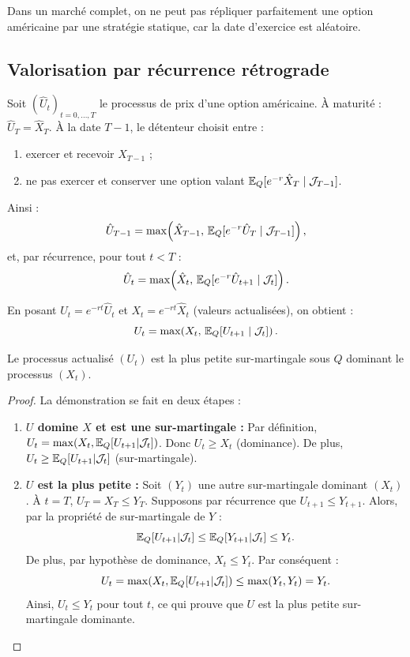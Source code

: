 Dans un marché complet, on ne peut pas répliquer parfaitement une option américaine par une stratégie statique, car la date d'exercice est aléatoire.

\subsection{Valorisation par récurrence rétrograde}

Soit $(\hat{U}_t)_{t=0,\dots,T}$ le processus de prix d'une option américaine.  
À maturité : $\hat{U}_T = \hat{X}_T$.  
À la date $T-1$, le détenteur choisit entre :
\begin{enumerate}
    \item exercer et recevoir $\hat{X}_{T-1}$ ;
    \item ne pas exercer et conserver une option valant
    $\mathbb{E}_Q[e^{-r}\hat{X}_T \mid \mathcal{J}_{T-1}]$.
\end{enumerate}
Ainsi :
\[
\hat{U}_{T-1} = \max\!\left(\hat{X}_{T-1},\, \mathbb{E}_Q[e^{-r}\hat{U}_T\mid\mathcal{J}_{T-1}]\right),
\]
et, par récurrence, pour tout $t<T$ :
\[
\hat{U}_t = \max\!\left(\hat{X}_t,\, \mathbb{E}_Q[e^{-r}\hat{U}_{t+1}\mid\mathcal{J}_t]\right).
\]

En posant $U_t = e^{-rt}\hat{U}_t$ et $X_t = e^{-rt}\hat{X}_t$ (valeurs actualisées), on obtient :
\begin{equation}
U_t = \max\!\left(X_t,\, \mathbb{E}_Q[U_{t+1}\mid\mathcal{J}_t]\right).
\end{equation}

\begin{proposition}
Le processus actualisé $(U_t)$ est la plus petite sur-martingale sous $Q$ dominant le processus $(X_t)$.
\end{proposition}

\begin{proof}
La démonstration se fait en deux étapes :
\begin{enumerate}
    \item \textbf{$U$ domine $X$ et est une sur-martingale :}
    Par définition, $U_t = \max(X_t, \mathbb{E}_Q[U_{t+1}|\mathcal{J}_t])$.
    Donc $U_t \ge X_t$ (dominance).
    De plus, $U_t \ge \mathbb{E}_Q[U_{t+1}|\mathcal{J}_t]$ (sur-martingale).
    
    \item \textbf{$U$ est la plus petite :}
    Soit $(Y_t)$ une autre sur-martingale dominant $(X_t)$.
    À $t=T$, $U_T = X_T \le Y_T$.
    Supposons par récurrence que $U_{t+1} \le Y_{t+1}$.
    Alors, par la propriété de sur-martingale de $Y$ :
    \[
    \mathbb{E}_Q[U_{t+1}|\mathcal{J}_t] \le \mathbb{E}_Q[Y_{t+1}|\mathcal{J}_t] \le Y_t.
    \]
    De plus, par hypothèse de dominance, $X_t \le Y_t$.
    Par conséquent :
    \[
    U_t = \max(X_t, \mathbb{E}_Q[U_{t+1}|\mathcal{J}_t]) \le \max(Y_t, Y_t) = Y_t.
    \]
    Ainsi, $U_t \le Y_t$ pour tout $t$, ce qui prouve que $U$ est la plus petite sur-martingale dominante.
\end{enumerate}
\end{proof}

